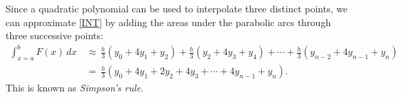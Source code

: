 \documentclass[12pt]{tjwNOTES}
\begin{document}
Since a quadratic polynomial can be used to interpolate three distinct points, we can approximate \eqref{INT} by adding the areas under the parabolic arcs through three successive points:
\begin{align*}
	\int_{x=a}^{b} F(x) \,dx &\,\approx\,  \frac{h}{3}(y_{0}+4y_{1}+y_{2}) +  \frac{h}{3}(y_{2}+4y_{3}+y_{4}) + \cdots +  \frac{h}{3}(y_{n-2}+4y_{n-1}+y_{n}) \\[0.2cm]
		&\,=\, \frac{h}{3}\left(y_{0} + 4y_{1} + 2y_{2} + 4y_{3} + \cdots + 4y_{n-1} + y_{n} \right).
\end{align*}
This is known as {\it Simpson's rule}. 





\end{document}
